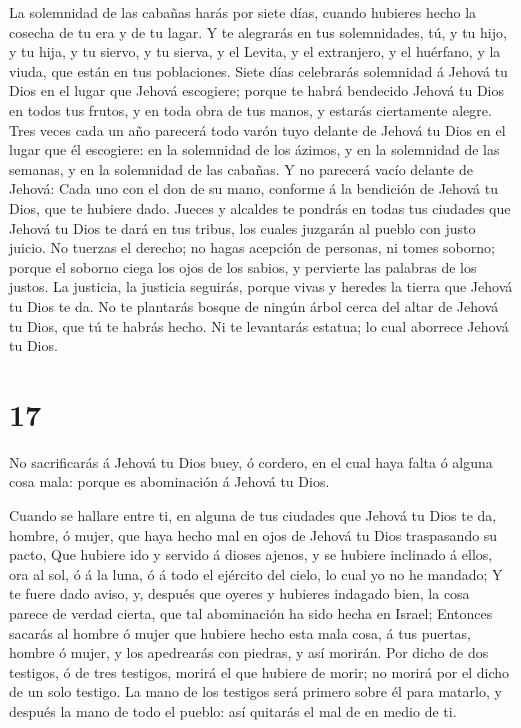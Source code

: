  La solemnidad de las cabañas harás por siete días, cuando
hubieres hecho la cosecha de tu era y de tu lagar.  Y te
alegrarás en tus solemnidades, tú, y tu hijo, y tu hija, y tu siervo, y
tu sierva, y el Levita, y el extranjero, y el huérfano, y la viuda, que
están en tus poblaciones.  Siete días celebrarás solemnidad
á Jehová tu Dios en el lugar que Jehová escogiere; porque te habrá
bendecido Jehová tu Dios en todos tus frutos, y en toda obra de tus
manos, y estarás ciertamente alegre.  Tres veces cada un
año parecerá todo varón tuyo delante de Jehová tu Dios en el lugar que
él escogiere: en la solemnidad de los ázimos, y en la solemnidad de las
semanas, y en la solemnidad de las cabañas. Y no parecerá vacío delante
de Jehová:  Cada uno con el don de su mano, conforme á la
bendición de Jehová tu Dios, que te hubiere dado.  Jueces y
alcaldes te pondrás en todas tus ciudades que Jehová tu Dios te dará en
tus tribus, los cuales juzgarán al pueblo con justo juicio.
 No tuerzas el derecho; no hagas acepción de personas, ni
tomes soborno; porque el soborno ciega los ojos de los sabios, y
pervierte las palabras de los justos.  La justicia, la
justicia seguirás, porque vivas y heredes la tierra que Jehová tu Dios
te da.  No te plantarás bosque de ningún árbol cerca del
altar de Jehová tu Dios, que tú te habrás hecho.  Ni te
levantarás estatua; lo cual aborrece Jehová tu Dios.

\hypertarget{section-16}{%
\section{17}\label{section-16}}

 No sacrificarás á Jehová tu Dios buey, ó cordero, en el
cual haya falta ó alguna cosa mala: porque es abominación á Jehová tu
Dios.

 Cuando se hallare entre ti, en alguna de tus ciudades que
Jehová tu Dios te da, hombre, ó mujer, que haya hecho mal en ojos de
Jehová tu Dios traspasando su pacto,  Que hubiere ido y
servido á dioses ajenos, y se hubiere inclinado á ellos, ora al sol, ó á
la luna, ó á todo el ejército del cielo, lo cual yo no he mandado;
 Y te fuere dado aviso, y, después que oyeres y hubieres
indagado bien, la cosa parece de verdad cierta, que tal abominación ha
sido hecha en Israel;  Entonces sacarás al hombre ó mujer
que hubiere hecho esta mala cosa, á tus puertas, hombre ó mujer, y los
apedrearás con piedras, y así morirán.  Por dicho de dos
testigos, ó de tres testigos, morirá el que hubiere de morir; no morirá
por el dicho de un solo testigo.  La mano de los testigos
será primero sobre él para matarlo, y después la mano de todo el pueblo:
así quitarás el mal de en medio de ti.

